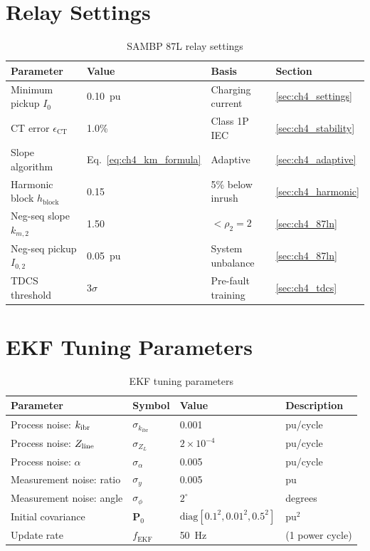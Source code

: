 \section{Relay Settings}
\label{app:relay_settings}

\begin{table}[htbp]
\caption{SAMBP 87L relay settings}
\label{tab:app_87l}
\begin{tabularx}{\textwidth}{@{}lXXl@{}}
\toprule
Parameter & Value & Basis & Section \\
\midrule
Minimum pickup $I_0$ & 0.10~pu & Charging current & \ref{sec:ch4_settings} \\
CT error $\epsilon_\mathrm{CT}$ & 1.0\% & Class 1P IEC & \ref{sec:ch4_stability} \\
Slope algorithm & Eq.~\eqref{eq:ch4_km_formula} & Adaptive & \ref{sec:ch4_adaptive} \\
Harmonic block $h_\mathrm{block}$ & 0.15 & 5\% below inrush & \ref{sec:ch4_harmonic} \\
Neg-seq slope $k_{m,2}$ & 1.50 & $< \rho_2 = 2$ & \ref{sec:ch4_87ln} \\
Neg-seq pickup $I_{0,2}$ & 0.05~pu & System unbalance & \ref{sec:ch4_87ln} \\
TDCS threshold & $3\sigma$ & Pre-fault training & \ref{sec:ch4_tdcs} \\
\bottomrule
\end{tabularx}
\end{table}

\section{EKF Tuning Parameters}
\label{app:ekf}

\begin{table}[htbp]
\caption{EKF tuning parameters}
\label{tab:app_ekf}
\begin{tabularx}{\textwidth}{@{}lXXl@{}}
\toprule
Parameter & Symbol & Value & Description \\
\midrule
Process noise: $k_\mathrm{ibr}$ & $\sigma_{k_\mathrm{ibr}}$ & 0.001 & pu/cycle \\
Process noise: $Z_\mathrm{line}$ & $\sigma_{Z_L}$ & $2\times10^{-4}$ & pu/cycle \\
Process noise: $\alpha$ & $\sigma_\alpha$ & 0.005 & pu/cycle \\
Measurement noise: ratio & $\sigma_y$ & 0.005 & pu \\
Measurement noise: angle & $\sigma_\phi$ & $2^\circ{}$ & degrees \\
Initial covariance & $\mathbf{P}_0$ & $\mathrm{diag}[0.1^2, 0.01^2, 0.5^2]$ & pu$^2$ \\
Update rate & $f_\mathrm{EKF}$ & 50~Hz & (1 power cycle) \\
\bottomrule
\end{tabularx}
\end{table}

